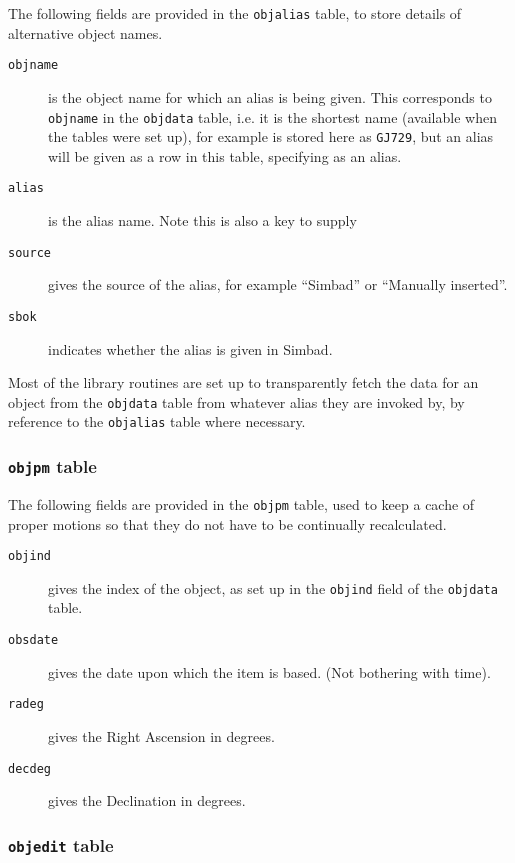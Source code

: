 The following fields are provided in the \texttt{objalias} table, to store
details of alternative object names.

\begin{description}
\item[\tt objname] is the object name for which an alias is being given. This
corresponds to \texttt{objname} in the \texttt{objdata} table, i.e. it is the
shortest name (available when the tables were set up), for example {\ross} is stored
here as \texttt{GJ729}, but an alias will be given as a row in this table,
specifying {\ross} as an alias.
\item[\tt alias] is the alias name. Note this is also a key to supply
\item[\tt source] gives the source of the alias, for example ``Simbad'' or
``Manually inserted''.
\item[\tt sbok] indicates whether the alias is given in Simbad.
\end{description}

Most of the library routines are set up to transparently fetch the data for an
object from the \texttt{objdata} table from whatever alias they are invoked by,
by reference to the \texttt{objalias} table where necessary.

\subsubsection{\texttt{objpm} table}
\protect\label{section:objpm}

The following fields are provided in the \texttt{objpm} table, used to keep a
cache of proper motions so that they do not have to be continually recalculated.

\begin{description}
\item[\tt objind] gives the index of the object, as set up in the
\texttt{objind} field of the \texttt{objdata} table.
\item[\tt obsdate] gives the date upon which the item is based. (Not bothering
with time).
\item[\tt radeg] gives the Right Ascension in degrees.
\item[\tt decdeg] gives the Declination in degrees.
\end{description}


\subsubsection{\texttt{objedit} table}
\protect\label{section:objedit}

